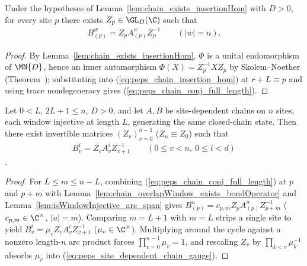 \begin{lemma}%
    \label{lem:chain_exists_conjugation_of_sameState}
    \leanok
    Under the hypotheses of Lemma~\ref{lem:chain_exists_insertionHom} with
    $D>0$, for every site $p$ there exists $Z_p\in\GL_D(\C)$ such that
    \begin{align}
        B_{(p)}^w = Z_p A_{(p)}^w Z_p^{-1}
        \qquad (|w|=n).
        \label{eq:peps_chain_conj_full_length}
    \end{align}
\end{lemma}
\begin{proof}\leanok
    By Lemma~\ref{lem:chain_exists_insertionHom}, $\Phi$ is a unital
    endomorphism of $\MN{D}$, hence an inner automorphism
    $\Phi(X)=Z_p^{-1} X Z_p$ by Skolem--Noether
    (Theorem~\cite[``Skolem--Noether'']{QICLean2026Blueprint}); substituting
    into (\ref{eq:peps_chain_insertion_hom}) at $r+L\equiv p$ and using trace
    nondegeneracy gives (\ref{eq:peps_chain_conj_full_length}).
\end{proof}

\begin{corollary}%
    \label{cor:fundamentalTheorem_normalMPSChain_of_overlap}
    \leanok
    Let $0<L$, $2L+1\le n$, $D>0$, and let $A,B$ be site-dependent chains on
    $n$ sites, each window injective at length $L$, generating the same
    closed-chain state. Then there exist invertible matrices
    $(Z_v)_{v=0}^{n-1}$ ($Z_n\equiv Z_0$) such that
    \begin{align}
        B_v^i = Z_v A_v^i Z_{v+1}^{-1}
        \qquad (0\le v<n,\ 0\le i<d)
        \label{eq:peps_site_dependent_chain_gauge}
    \end{align}
    \cite[Section~``Normal MPS: alternative proof'']{Molnar2018NormalPEPS}.
\end{corollary}
\begin{proof}\leanok
    For $L\le m\le n-L$, combining (\ref{eq:peps_chain_conj_full_length}) at
    $p$ and $p+m$ with Lemma~\ref{lem:chain_overlapWindow_exists_bondOperator}
    and Lemma~\ref{lem:isWindowInjective_arc_span} gives
    $B_{(p)}^u = c_{p,m} Z_p A_{(p)}^u Z_{p+m}^{-1}$ ($c_{p,m}\in\C^\times$,
    $|u|=m$). Comparing $m=L+1$ with $m=L$ strips a single site to yield
    $B_v^i = \mu_v Z_v A_v^i Z_{v+1}^{-1}$ ($\mu_v\in\C^\times$). Multiplying
    around the cycle against a nonzero length-$n$ arc product forces
    $\prod_{v=0}^{n-1}\mu_v=1$, and rescaling $Z_v$ by $\prod_{k<v}\mu_k^{-1}$
    absorbs $\mu_v$ into (\ref{eq:peps_site_dependent_chain_gauge}).
\end{proof}

